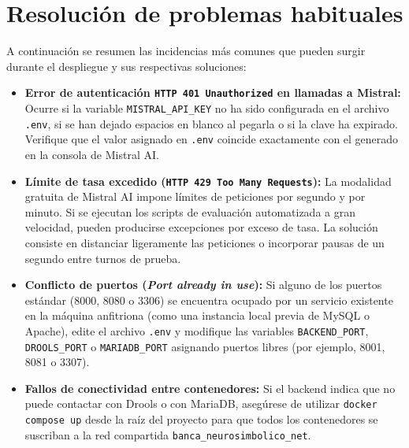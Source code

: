 \section{Resolución de problemas habituales}

A continuación se resumen las incidencias más comunes que pueden surgir durante el despliegue y sus respectivas soluciones:

\begin{itemize}
    \item \textbf{Error de autenticación \texttt{HTTP 401 Unauthorized} en llamadas a Mistral:} Ocurre si la variable \texttt{MISTRAL\_API\_KEY} no ha sido configurada en el archivo \texttt{.env}, si se han dejado espacios en blanco al pegarla o si la clave ha expirado. Verifique que el valor asignado en \texttt{.env} coincide exactamente con el generado en la consola de Mistral AI.
    
    \item \textbf{Límite de tasa excedido (\texttt{HTTP 429 Too Many Requests}):} La modalidad gratuita de Mistral AI impone límites de peticiones por segundo y por minuto. Si se ejecutan los scripts de evaluación automatizada a gran velocidad, pueden producirse excepciones por exceso de tasa. La solución consiste en distanciar ligeramente las peticiones o incorporar pausas de un segundo entre turnos de prueba.

    \item \textbf{Conflicto de puertos (\textit{Port already in use}):} Si alguno de los puertos estándar (8000, 8080 o 3306) se encuentra ocupado por un servicio existente en la máquina anfitriona (como una instancia local previa de MySQL o Apache), edite el archivo \texttt{.env} y modifique las variables \texttt{BACKEND\_PORT}, \texttt{DROOLS\_PORT} o \texttt{MARIADB\_PORT} asignando puertos libres (por ejemplo, 8001, 8081 o 3307).

    \item \textbf{Fallos de conectividad entre contenedores:} Si el backend indica que no puede contactar con Drools o con MariaDB, asegúrese de utilizar \texttt{docker compose up} desde la raíz del proyecto para que todos los contenedores se suscriban a la red compartida \texttt{banca\_neurosimbolico\_net}.
\end{itemize}

